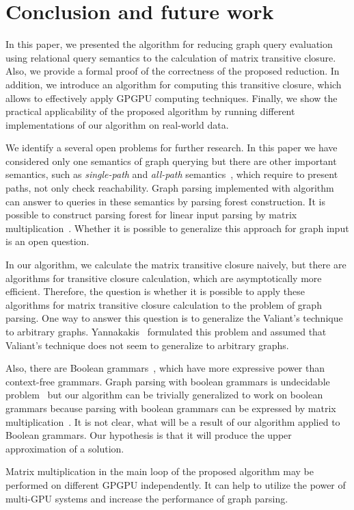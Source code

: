 \section{Conclusion and future work}
In this paper, we presented the algorithm for reducing graph query evaluation using relational query semantics to the calculation of matrix transitive closure. Also, we provide a formal proof of the correctness of the proposed reduction. In addition, we introduce an algorithm for computing this transitive closure, which allows to effectively apply GPGPU computing techniques. Finally, we show the practical applicability of the proposed algorithm by running different implementations of our algorithm on real-world data.

We identify a several open problems for further research. In this paper we have considered only one semantics of graph querying but there are other important semantics, such as \textit{single-path} and \textit{all-path} semantics~\cite{hellingsPathQuerying}, which require to present paths, not only check reachability. Graph parsing implemented with algorithm~\cite{GLL} can answer to queries in these semantics by parsing forest construction. It is possible to construct parsing forest for linear input parsing by matrix multiplication~\cite{okhotin_cyk}. Whether it is possible to generalize this approach for graph input is an open question.

In our algorithm, we calculate the matrix transitive closure naively, but there are algorithms for transitive closure calculation, which are asymptotically more efficient. Therefore, the question is whether it is possible to apply these algorithms for matrix transitive closure calculation to the problem of graph parsing. One way to answer this question is to generalize the Valiant's technique to arbitrary graphs. Yannakakis~\cite{transitive-closure} formulated this problem and assumed that Valiant's technique does not seem to generalize to arbitrary graphs.

Also, there are Boolean grammars~\cite{okhotinBoolean}, which have more expressive power than context-free grammars. Graph parsing with boolean grammars is undecidable problem~\cite{hellingsRelational} but our algorithm can be trivially generalized to work on boolean grammars because parsing with boolean grammars can be expressed by matrix multiplication~\cite{okhotin_cyk}. It is not clear, what will be a result of our algorithm applied to Boolean grammars. Our hypothesis is that it will produce the upper approximation of a solution.

Matrix multiplication in the main loop of the proposed algorithm may be performed on different GPGPU independently. It can help to utilize the power of multi-GPU systems and increase the performance of graph parsing.